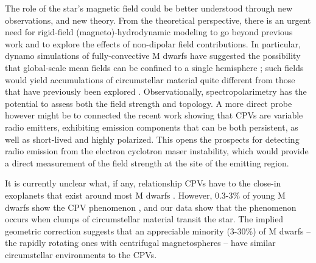 \documentclass{nature3}
\begin{document}
The role of the star's magnetic field could be better understood
through new observations, and new theory.  From the theoretical
perspective, there is an urgent need for rigid-field
(magneto)-hydrodynamic modeling to go beyond previous work
\cite{Townsend2005,Townsend2008} and to explore the effects of
non-dipolar field contributions.
In particular, dynamo simulations of fully-convective M dwarfs have
suggested the possibility that global-scale mean fields can be
confined to a single hemisphere \cite{Brown2020}; such fields would
yield accumulations of circumstellar material quite different
from those that have previously been explored \cite{Townsend2008}.
Observationally, spectropolarimetry has the potential to
assess both the field strength and topology.  A more direct probe
however might be to connected the recent work \cite{Kaur2024} showing
that CPVs are variable radio emitters, exhibiting emission components
that can be both persistent, as well as short-lived and highly
polarized.  This opens the prospects for detecting radio emission
from the electron cyclotron maser instability, which would
provide a direct measurement of the field strength at the site of the
emitting region.

It is currently unclear what, if any, relationship CPVs have to the
close-in exoplanets that exist around most M dwarfs
\cite{Dressing2015}.  However, 0.3-3\% of young M dwarfs show the CPV
phenomenon \cite{Rebull2020}, and our data show that the phenomenon
occurs when clumps of circumstellar material transit the star.  The
implied geometric correction suggests that an appreciable minority
(3-30\%) of M dwarfs -- the rapidly rotating ones with centrifugal
magnetospheres -- have similar circumstellar environments to the CPVs.




\end{document}
